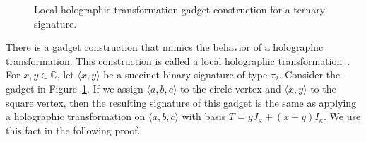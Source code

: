 \documentclass[11pt]{article}
\def\borderColor{blue!60}
\def\scale{0.6}
\def\nodeDist{1.4cm}
\begin{document}
\begin{figure}[ht]
 \centering
 \caption{Local holographic transformation gadget construction for a ternary signature.}
 \label{fig:gadget:compute:ternary:local_holographic_transformation}
\end{figure}

There is a gadget construction that mimics the behavior of a holographic transformation.
This construction is called a local holographic transformation~\cite{CLX14}.
For $x,y \in \mathbb{C}$,
let $\langle x,y \rangle$ be a succinct binary signature of type $\tau_2$.
Consider the gadget in Figure~\ref{fig:gadget:compute:ternary:local_holographic_transformation}.
If we assign $\langle a,b,c \rangle$ to the circle vertex and $\langle x,y \rangle$ to the square vertex,
then the resulting signature of this gadget is the same as applying a holographic transformation on $\langle a,b,c \rangle$ with basis
$T = y J_\kappa + (x - y) I_\kappa$.
We use this fact in the following proof.
\end{document}
